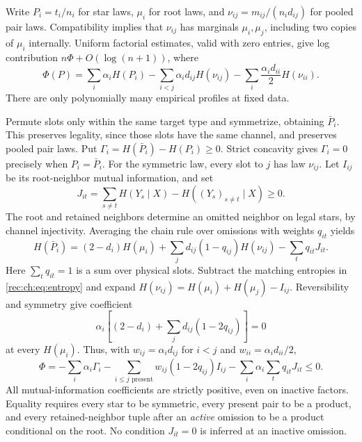 \documentclass[11pt]{article}
\theoremstyle{definition}
\theoremstyle{remark}
\newcommand{\1}{\mathbf 1}
\begin{document}
Write $P_i=t_i/n_i$ for star laws, $\mu_i$ for root laws, and $\nu_{ij}=m_{ij}/(n_id_{ij})$ for pooled pair laws. Compatibility implies that $\nu_{ij}$ has marginals $\mu_i,\mu_j$, including two copies of $\mu_i$ internally. Uniform factorial estimates, valid with zero entries, give log contribution $n\Phi+O(\log(n+1))$, where
\begin{equation}\label{rec:ch:eq:entropy}
 \Phi(P)=\sum_i\alpha_iH(P_i)
 -\sum_{i<j}\alpha_id_{ij}H(\nu_{ij})
 -\sum_i\frac{\alpha_id_{ii}}2H(\nu_{ii}).
\end{equation}
There are only polynomially many empirical profiles at fixed data.

Permute slots only within the same target type and symmetrize, obtaining $\bar P_i$. This preserves legality, since those slots have the same channel, and preserves pooled pair laws. Put $\Gamma_i=H(\bar P_i)-H(P_i)\ge0$. Strict concavity gives $\Gamma_i=0$ precisely when $P_i=\bar P_i$. For the symmetric law, every slot to $j$ has law $\nu_{ij}$. Let $I_{ij}$ be its root-neighbor mutual information, and set
\[
 J_{it}=\sum_{s\ne t}H(Y_s\mid X)-H((Y_s)_{s\ne t}\mid X)\ge0.
\]
The root and retained neighbors determine an omitted neighbor on legal stars, by channel injectivity. Averaging the chain rule over omissions with weights $q_{it}$ yields
\begin{equation}\label{rec:ch:eq:localentropy}
 H(\bar P_i)=(2-d_i)H(\mu_i)
 +\sum_jd_{ij}(1-q_{ij})H(\nu_{ij})-\sum_tq_{it}J_{it}.
\end{equation}
Here $\sum_tq_{it}=1$ is a sum over physical slots. Subtract the matching entropies in \eqref{rec:ch:eq:entropy} and expand $H(\nu_{ij})=H(\mu_i)+H(\mu_j)-I_{ij}$. Reversibility and symmetry give coefficient
\[
 \alpha_i\left[(2-d_i)+\sum_jd_{ij}(1-2q_{ij})\right]=0
\]
at every $H(\mu_i)$. Thus, with $w_{ij}=\alpha_id_{ij}$ for $i<j$ and $w_{ii}=\alpha_id_{ii}/2$,
\begin{equation}\label{rec:ch:eq:identity}
 \Phi=-\sum_i\alpha_i\Gamma_i
 -\sum_{i\le j\text{ present}}w_{ij}(1-2q_{ij})I_{ij}
 -\sum_i\alpha_i\sum_tq_{it}J_{it}\le0.
\end{equation}
All mutual-information coefficients are strictly positive, even on inactive factors. Equality requires every star to be symmetric, every present pair to be a product, and every retained-neighbor tuple after an \emph{active} omission to be a product conditional on the root. No condition $J_{it}=0$ is inferred at an inactive omission.
\end{document}
